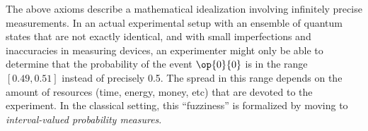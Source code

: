\documentclass[english,reprint, aps, prl,superscriptaddress, showpacs,
showkeys, longbibliography, amsmath, amssymb]{revtex4-1}
\theoremstyle{plain}
\theoremstyle{definition}
\newcommand{\events}{\ensuremath{\mathcal{E}}}
\newcommand{\proj}[1]{\op{#1}{#1}}
\newcommand{\Tr}{\ensuremath{\mathop{\mathrm{Tr}}\nolimits}}
\begin{document}
The above axioms describe a mathematical idealization involving
infinitely precise measurements. In an actual experimental setup with
an ensemble of quantum states that are not exactly identical, and with
small imperfections and inaccuracies in measuring devices, an
experimenter might only be able to determine that the probability of
the event $\proj{0}$ is in the range $[0.49,0.51]$ instead of
precisely 0.5. The spread in this range depends on the amount of
resources (time, energy, money, etc) that are devoted to the
experiment. In the classical setting, this ``fuzziness'' is formalized
by moving to \emph{interval-valued probability measures}.


\end{document}
